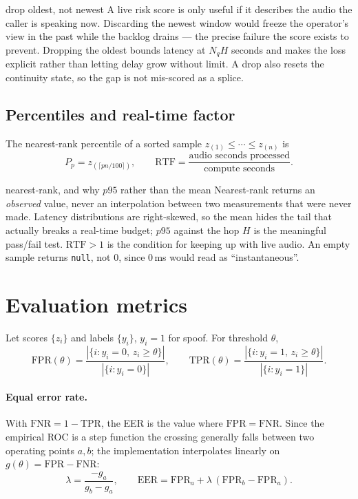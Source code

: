 \documentclass[11pt,a4paper]{article}
\newcommand{\code}[1]{\texttt{\small #1}}
\begin{document}
\begin{whybox}{drop oldest, not newest}
A live risk score is only useful if it describes the audio the caller is speaking now.
Discarding the newest window would freeze the operator's view in the past while the
backlog drains --- the precise failure the score exists to prevent. Dropping the oldest
bounds latency at $N_q H$ seconds and makes the loss explicit rather than letting delay
grow without limit. A drop also resets the continuity state, so the gap is not
mis-scored as a splice.
\end{whybox}

\subsection{Percentiles and real-time factor}

The nearest-rank percentile of a sorted sample $z_{(1)} \le \cdots \le z_{(n)}$ is
\begin{equation}
P_p = z_{(\lceil pn/100 \rceil)},
\qquad
\mathrm{RTF} = \frac{\text{audio seconds processed}}{\text{compute seconds}} .
\end{equation}

\begin{whybox}{nearest-rank, and why $p95$ rather than the mean}
Nearest-rank returns an \emph{observed} value, never an interpolation between two
measurements that were never made. Latency distributions are right-skewed, so the mean
hides the tail that actually breaks a real-time budget; $p95$ against the hop $H$ is the
meaningful pass/fail test. $\mathrm{RTF} > 1$ is the condition for keeping up with live
audio. An empty sample returns \code{null}, not $0$, since $0$\,ms would read as
``instantaneous''.
\end{whybox}

\section{Evaluation metrics}

Let scores $\{z_i\}$ and labels $\{y_i\}$, $y_i = 1$ for spoof. For threshold $\theta$,
\begin{equation}
\mathrm{FPR}(\theta) = \frac{|\{i: y_i=0,\, z_i \ge \theta\}|}{|\{i : y_i = 0\}|},
\qquad
\mathrm{TPR}(\theta) = \frac{|\{i: y_i=1,\, z_i \ge \theta\}|}{|\{i : y_i = 1\}|}.
\end{equation}

\paragraph{Equal error rate.} With $\mathrm{FNR} = 1-\mathrm{TPR}$, the EER is the value
where $\mathrm{FPR} = \mathrm{FNR}$. Since the empirical ROC is a step function the
crossing generally falls between two operating points $a,b$; the implementation
interpolates linearly on $g(\theta) = \mathrm{FPR}-\mathrm{FNR}$:
\begin{equation}
\lambda = \frac{-g_a}{g_b - g_a},
\qquad
\mathrm{EER} = \mathrm{FPR}_a + \lambda\,(\mathrm{FPR}_b - \mathrm{FPR}_a).
\end{equation}
\end{document}
